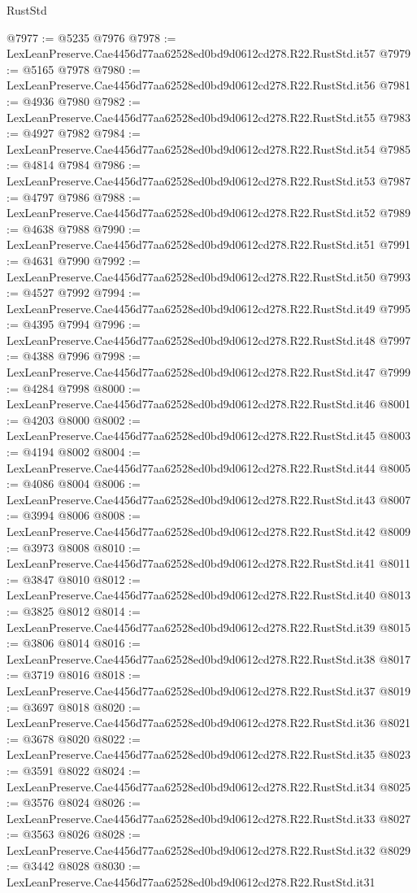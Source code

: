 \begin{lexlean}{RustStd}
\begin{coremodule}
@7977 := @5235 @7976
@7978 := LexLeanPreserve.Cae4456d77aa62528ed0bd9d0612cd278.R22.RustStd.it57
@7979 := @5165 @7978
@7980 := LexLeanPreserve.Cae4456d77aa62528ed0bd9d0612cd278.R22.RustStd.it56
@7981 := @4936 @7980
@7982 := LexLeanPreserve.Cae4456d77aa62528ed0bd9d0612cd278.R22.RustStd.it55
@7983 := @4927 @7982
@7984 := LexLeanPreserve.Cae4456d77aa62528ed0bd9d0612cd278.R22.RustStd.it54
@7985 := @4814 @7984
@7986 := LexLeanPreserve.Cae4456d77aa62528ed0bd9d0612cd278.R22.RustStd.it53
@7987 := @4797 @7986
@7988 := LexLeanPreserve.Cae4456d77aa62528ed0bd9d0612cd278.R22.RustStd.it52
@7989 := @4638 @7988
@7990 := LexLeanPreserve.Cae4456d77aa62528ed0bd9d0612cd278.R22.RustStd.it51
@7991 := @4631 @7990
@7992 := LexLeanPreserve.Cae4456d77aa62528ed0bd9d0612cd278.R22.RustStd.it50
@7993 := @4527 @7992
@7994 := LexLeanPreserve.Cae4456d77aa62528ed0bd9d0612cd278.R22.RustStd.it49
@7995 := @4395 @7994
@7996 := LexLeanPreserve.Cae4456d77aa62528ed0bd9d0612cd278.R22.RustStd.it48
@7997 := @4388 @7996
@7998 := LexLeanPreserve.Cae4456d77aa62528ed0bd9d0612cd278.R22.RustStd.it47
@7999 := @4284 @7998
@8000 := LexLeanPreserve.Cae4456d77aa62528ed0bd9d0612cd278.R22.RustStd.it46
@8001 := @4203 @8000
@8002 := LexLeanPreserve.Cae4456d77aa62528ed0bd9d0612cd278.R22.RustStd.it45
@8003 := @4194 @8002
@8004 := LexLeanPreserve.Cae4456d77aa62528ed0bd9d0612cd278.R22.RustStd.it44
@8005 := @4086 @8004
@8006 := LexLeanPreserve.Cae4456d77aa62528ed0bd9d0612cd278.R22.RustStd.it43
@8007 := @3994 @8006
@8008 := LexLeanPreserve.Cae4456d77aa62528ed0bd9d0612cd278.R22.RustStd.it42
@8009 := @3973 @8008
@8010 := LexLeanPreserve.Cae4456d77aa62528ed0bd9d0612cd278.R22.RustStd.it41
@8011 := @3847 @8010
@8012 := LexLeanPreserve.Cae4456d77aa62528ed0bd9d0612cd278.R22.RustStd.it40
@8013 := @3825 @8012
@8014 := LexLeanPreserve.Cae4456d77aa62528ed0bd9d0612cd278.R22.RustStd.it39
@8015 := @3806 @8014
@8016 := LexLeanPreserve.Cae4456d77aa62528ed0bd9d0612cd278.R22.RustStd.it38
@8017 := @3719 @8016
@8018 := LexLeanPreserve.Cae4456d77aa62528ed0bd9d0612cd278.R22.RustStd.it37
@8019 := @3697 @8018
@8020 := LexLeanPreserve.Cae4456d77aa62528ed0bd9d0612cd278.R22.RustStd.it36
@8021 := @3678 @8020
@8022 := LexLeanPreserve.Cae4456d77aa62528ed0bd9d0612cd278.R22.RustStd.it35
@8023 := @3591 @8022
@8024 := LexLeanPreserve.Cae4456d77aa62528ed0bd9d0612cd278.R22.RustStd.it34
@8025 := @3576 @8024
@8026 := LexLeanPreserve.Cae4456d77aa62528ed0bd9d0612cd278.R22.RustStd.it33
@8027 := @3563 @8026
@8028 := LexLeanPreserve.Cae4456d77aa62528ed0bd9d0612cd278.R22.RustStd.it32
@8029 := @3442 @8028
@8030 := LexLeanPreserve.Cae4456d77aa62528ed0bd9d0612cd278.R22.RustStd.it31

\end{coremodule}
\end{lexlean}
